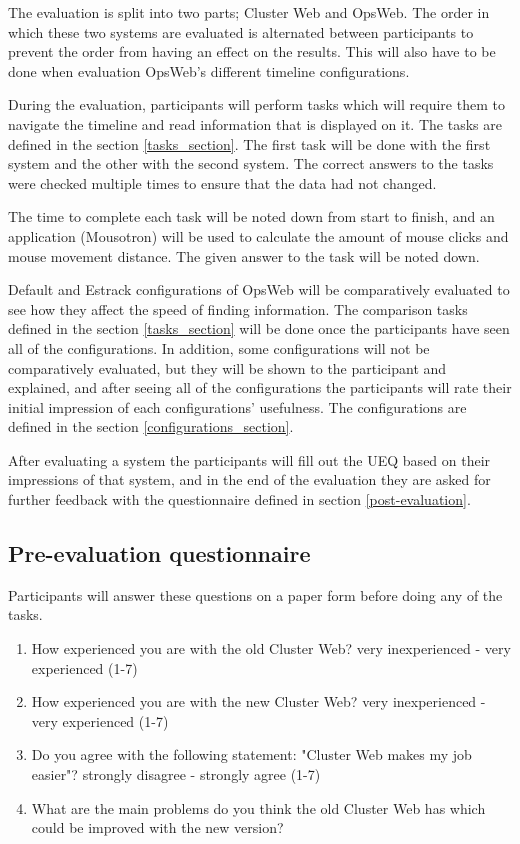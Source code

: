 The evaluation is split into two parts; Cluster Web and OpsWeb. The order in which these two systems are evaluated is alternated between participants to prevent the order from having an effect on the results. This will also have to be done when evaluation OpsWeb's different timeline configurations.

During the evaluation, participants will perform tasks which will require them to navigate the timeline and read information that is displayed on it. The tasks are defined in the section \ref{tasks_section}. The first task will be done with the first system and the other with the second system. The correct answers to the tasks were checked multiple times to ensure that the data had not changed.

The time to complete each task will be noted down from start to finish, and an application (Mousotron) \cite{mousotron} will be used to calculate the amount of mouse clicks and mouse movement distance. The given answer to the task will be noted down.

Default and Estrack configurations of OpsWeb will be comparatively evaluated to see how they affect the speed of finding information. The comparison tasks defined in the section \ref{tasks_section} will be done once the participants have seen all of the configurations. In addition, some configurations will not be comparatively evaluated, but they will be shown to the participant and explained, and after seeing all of the configurations the participants will rate their initial impression of each configurations' usefulness. The configurations are defined in the section \ref{configurations_section}.

 After evaluating a system the participants will fill out the UEQ based on their impressions of that system, and in the end of the evaluation they are asked for further feedback with the questionnaire defined in section \ref{post-evaluation}.

\subsection{Pre-evaluation questionnaire} \label{pre-evaluation}
Participants will answer these questions on a paper form before doing any of the tasks.
\begin{enumerate}
\item How experienced you are with the old Cluster Web? very inexperienced - very experienced (1-7)
\item How experienced you are with the new Cluster Web? very inexperienced - very experienced (1-7)
\item Do you agree with the following statement: "Cluster Web makes my job easier"? strongly disagree - strongly agree (1-7)
\item What are the main problems do you think the old Cluster Web has which could be improved with the new version?
\end{enumerate}

